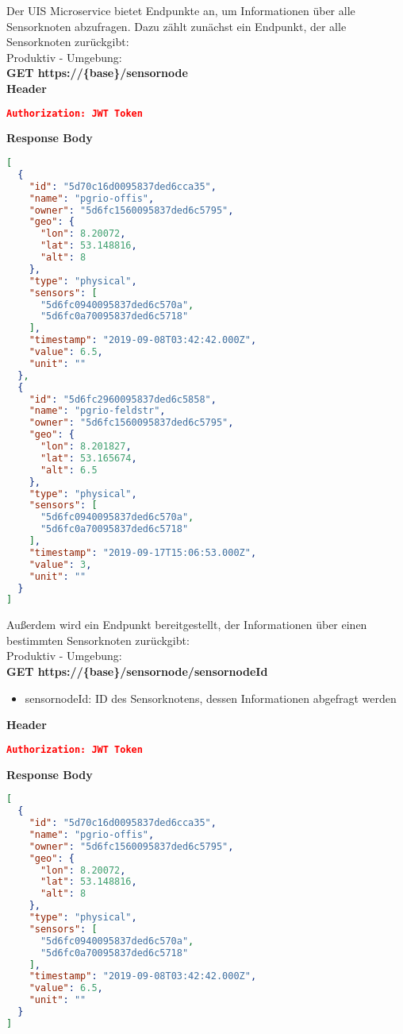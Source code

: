Der UIS Microservice bietet Endpunkte an, um Informationen über alle Sensorknoten abzufragen.
Dazu zählt zunächst ein Endpunkt, der alle Sensorknoten zurückgibt:
\\
Produktiv - Umgebung:
\\
\textbf{GET https://\{base\}/sensornode}
\\
\textbf{Header}
\begin{lstlisting}[language=json,firstnumber=1,basicstyle=\footnotesize]
Authorization: JWT Token
\end{lstlisting}
\textbf{Response Body}
\begin{lstlisting}[language=json,firstnumber=1,basicstyle=\footnotesize]
[
  {
    "id": "5d70c16d0095837ded6cca35",
    "name": "pgrio-offis",
    "owner": "5d6fc1560095837ded6c5795",
    "geo": {
      "lon": 8.20072,
      "lat": 53.148816,
      "alt": 8
    },
    "type": "physical",
    "sensors": [
      "5d6fc0940095837ded6c570a",
      "5d6fc0a70095837ded6c5718"
    ],
    "timestamp": "2019-09-08T03:42:42.000Z",
    "value": 6.5,
    "unit": ""
  },
  {
    "id": "5d6fc2960095837ded6c5858",
    "name": "pgrio-feldstr",
    "owner": "5d6fc1560095837ded6c5795",
    "geo": {
      "lon": 8.201827,
      "lat": 53.165674,
      "alt": 6.5
    },
    "type": "physical",
    "sensors": [
      "5d6fc0940095837ded6c570a",
      "5d6fc0a70095837ded6c5718"
    ],
    "timestamp": "2019-09-17T15:06:53.000Z",
    "value": 3,
    "unit": ""
  }
]
\end{lstlisting}
Außerdem wird ein Endpunkt bereitgestellt, der Informationen über einen bestimmten Sensorknoten zurückgibt:
\\
Produktiv - Umgebung:
\\
\textbf{GET https://\{base\}/sensornode/sensornodeId}
\begin{itemize}
	\item sensornodeId: ID des Sensorknotens, dessen Informationen abgefragt werden
\end{itemize}
\textbf{Header}
\begin{lstlisting}[language=json,firstnumber=1,basicstyle=\footnotesize]
Authorization: JWT Token
\end{lstlisting}
\textbf{Response Body}
\begin{lstlisting}[language=json,firstnumber=1,basicstyle=\footnotesize]
[
  {
    "id": "5d70c16d0095837ded6cca35",
    "name": "pgrio-offis",
    "owner": "5d6fc1560095837ded6c5795",
    "geo": {
      "lon": 8.20072,
      "lat": 53.148816,
      "alt": 8
    },
    "type": "physical",
    "sensors": [
      "5d6fc0940095837ded6c570a",
      "5d6fc0a70095837ded6c5718"
    ],
    "timestamp": "2019-09-08T03:42:42.000Z",
    "value": 6.5,
    "unit": ""
  }
]
\end{lstlisting}

